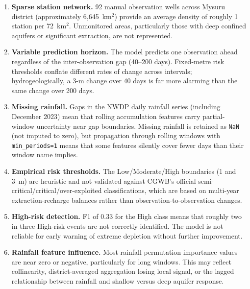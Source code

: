 \documentclass[conference]{IEEEtran}
\begin{document}
\begin{enumerate}\setlength{\itemsep}{0pt}\setlength{\parskip}{0pt}
  \item \textbf{Sparse station network.}
        92 manual observation wells across Mysuru district
        (approximately 6,645~km$^2$) provide an average density
        of roughly 1 station per 72~km$^2$.
        Unmonitored areas, particularly those with deep confined
        aquifers or significant extraction, are not represented.

  \item \textbf{Variable prediction horizon.}
        The model predicts one observation ahead regardless of
        the inter-observation gap (40--200 days).
        Fixed-metre risk thresholds conflate different rates of
        change across intervals; hydrogeologically, a 3-m change
        over 40 days is far more alarming than the same change
        over 200 days.

  \item \textbf{Missing rainfall.}
        Gaps in the NWDP daily rainfall series (including December 2023)
        mean that rolling accumulation features carry partial-window
        uncertainty near gap boundaries.
        Missing rainfall is retained as \texttt{NaN}
        (not imputed to zero), but propagation through rolling
        windows with \texttt{min\_periods=1} means that some
        features silently cover fewer days than their window name
        implies.

  \item \textbf{Empirical risk thresholds.}
        The Low/Moderate/High boundaries (1 and 3~m) are heuristic
        and not validated against CGWB's official
        semi-critical/critical/over-exploited classifications,
        which are based on multi-year extraction-recharge balances
        rather than observation-to-observation changes.

  \item \textbf{High-risk detection.}
        F1 of 0.33 for the High class means that roughly two in three
        High-risk events are not correctly identified.
        The model is not reliable for early warning of extreme
        depletion without further improvement.

  \item \textbf{Rainfall feature influence.}
        Most rainfall permutation-importance values are near zero
        or negative, particularly for long windows.
        This may reflect collinearity, district-averaged aggregation
        losing local signal, or the lagged relationship between
        rainfall and shallow versus deep aquifer response.


\end{enumerate}
\end{document}
